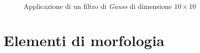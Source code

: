 \begin{figure}[H]
	\centering
	\caption{Applicazione di un filtro di \textit{Gauss} di dimensione $10\times10$} \label{fig:gauss-filter}
\end{figure}


\section{Elementi di morfologia}
\label{sec:math-morph}

